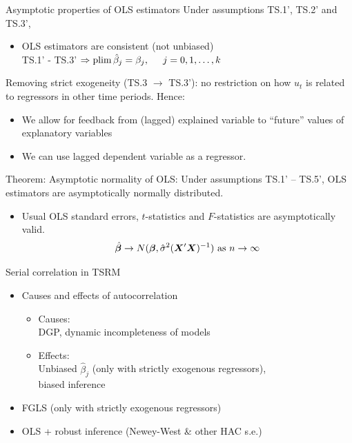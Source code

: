 \documentclass{beamer}
\begin{document}
\begin{frame}{Asymptotic properties of OLS estimators}
Under assumptions TS.1', TS.2' and TS.3', \\ \medskip
\begin{itemize}
\item OLS estimators are consistent (not unbiased)\\ 
\medskip
TS.1' - TS.3' $\Rightarrow \textnormal{plim}\,\hat{\beta}_j = \beta_j, \hspace{0.5cm} j=0, 1, \dots, k$
\end{itemize} \bigskip
Removing strict exogeneity (TS.3 $\rightarrow$ TS.3'): no restriction on how $u_t$ is related to regressors in other time periods. Hence: \\
\medskip
\begin{itemize}
\item We allow for feedback from (lagged) explained variable to ``future'' values of explanatory variables 
\medskip
\item We can use lagged dependent variable as a regressor.
\end{itemize} \medskip
Theorem: Asymptotic normality of OLS: Under assumptions TS.1' – TS.5', OLS estimators are asymptotically normally distributed. \medskip
\begin{itemize}
\item Usual OLS standard errors, $t$-statistics and $F$-statistics are asymptotically valid.
$$
\hat{\bm{\beta}} \rightarrow N(\bm{\beta}, \hat{\sigma}^2(\bm{X}^{\prime} \bm{X})^{-1} )
\textnormal{~as~} n \rightarrow \infty
$$
\end{itemize}
\end{frame}
\begin{frame}{Serial correlation in TSRM}
\begin{itemize}
\item Causes and effects of autocorrelation \\ \bigskip 
 \begin{itemize}
     \item Causes:  \\ \smallskip DGP, dynamic incompleteness of models
     \bigskip
     \item Effects: \\\smallskip Unbiased $\hat{\beta}_j$ (only with strictly exogenous regressors),\\ biased inference
 \end{itemize}
\bigskip
\item FGLS (only with strictly exogenous regressors)
\bigskip
\item OLS + robust inference (Newey-West \& other HAC s.e.)
\end{itemize}
\end{frame}
\end{document}
